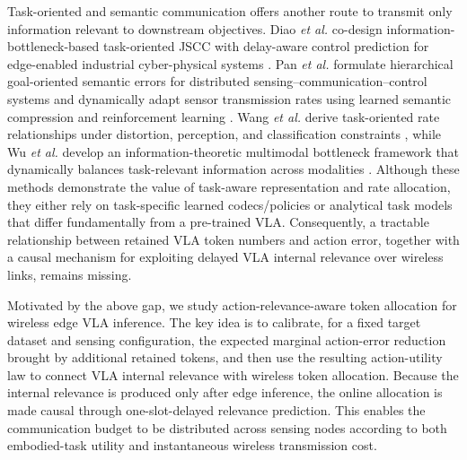 \documentclass[lettersize,journal]{IEEEtran}
\theoremstyle{custom}
\begin{document}
Task-oriented and semantic communication offers another route to transmit only information relevant to downstream objectives. Diao \emph{et al.} co-design information-bottleneck-based task-oriented JSCC with delay-aware control prediction for edge-enabled industrial cyber-physical systems \cite{diao2025taskoriented}. Pan \emph{et al.} formulate hierarchical goal-oriented semantic errors for distributed sensing--communication--control systems and dynamically adapt sensor transmission rates using learned semantic compression and reinforcement learning \cite{pan2025semantic}. Wang \emph{et al.} derive task-oriented rate relationships under distortion, perception, and classification constraints \cite{wang2025lossy}, while Wu \emph{et al.} develop an information-theoretic multimodal bottleneck framework that dynamically balances task-relevant information across modalities \cite{wu2025omib}. Although these methods demonstrate the value of task-aware representation and rate allocation, they either rely on task-specific learned codecs/policies or analytical task models that differ fundamentally from a pre-trained VLA. Consequently, a tractable relationship between retained VLA token numbers and action error, together with a causal mechanism for exploiting delayed VLA internal relevance over wireless links, remains missing.

Motivated by the above gap, we study action-relevance-aware token allocation for wireless edge VLA inference. The key idea is to calibrate, for a fixed target dataset and sensing configuration, the expected marginal action-error reduction brought by additional retained tokens, and then use the resulting action-utility law to connect VLA internal relevance with wireless token allocation. Because the internal relevance is produced only after edge inference, the online allocation is made causal through one-slot-delayed relevance prediction. This enables the communication budget to be distributed across sensing nodes according to both embodied-task utility and instantaneous wireless transmission cost.
\end{document}
